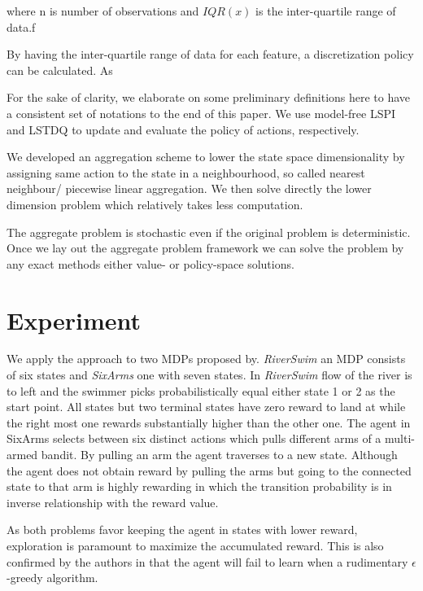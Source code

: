 \documentclass{article}
\begin{document}
    where n is number of observations and $IQR(x)$ is the inter-quartile range of data.f

    By having the inter-quartile range of data for each feature, a discretization policy can be calculated.
    As


    For the sake of clarity, we elaborate on some preliminary definitions here to have a consistent set of notations
    to the end of this paper. We use model-free LSPI and LSTDQ \citep{Lagoudakis2003} to update and
    evaluate the policy of actions, respectively.

    We developed an aggregation scheme to lower the state space dimensionality by assigning same action to the state
    in a neighbourhood, so called nearest neighbour/ piecewise linear aggregation.
    We then solve directly the lower dimension problem which relatively takes less computation.

    The aggregate problem is stochastic even if the original problem is deterministic.
    Once we lay out the aggregate problem framework we can solve the problem by any exact methods either value- or
    policy-space solutions.


    \section{Experiment}
    We apply the approach to two MDPs proposed by\cite{Strehl2004}.
    \textit{RiverSwim} an MDP consists of six states and \textit{SixArms} one with seven states.
    In \textit{RiverSwim} flow of the river is to left and the swimmer picks probabilistically equal either state 1
    or 2 as the start point.
    All states but two terminal states have zero reward to land at while the right most one rewards substantially
    higher than the other one.
    The agent in SixArms selects between six distinct actions which pulls different arms of a multi-armed bandit.
    By pulling an arm the agent traverses to a new state.
    Although the agent does not obtain reward by pulling the arms but going to the connected state to that arm is
    highly rewarding in which the transition probability is in inverse relationship with the reward value.

    As both problems favor keeping the agent in states with lower reward, exploration is paramount to maximize the
    accumulated reward.
    This is also confirmed by the authors in \cite{Strehl2004} that the agent will fail to learn when a rudimentary
    $\epsilon$-greedy algorithm.
\end{document}
